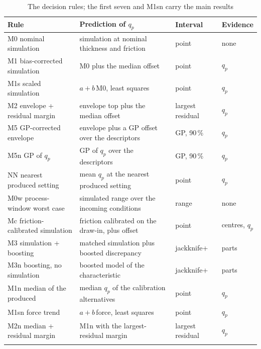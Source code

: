\documentclass[pdflatex,sn-basic,lineno]{sn-jnl}
\newcommand{\tabsize}{\fontsize{8}{9.5}\selectfont}
\begin{document}
\begin{table}[t]
\tabsize
\setlength{\tabcolsep}{3.5pt}
\caption{The decision rules; the first seven and M1sn carry the main results}\label{tab:rules}
\begin{tabular}{@{}L{3.5cm}L{4.9cm}L{1.9cm}L{1.4cm}@{}}
\toprule
Rule & Prediction of $q_p$ & Interval & Evidence \\
\midrule
M0 nominal simulation & simulation at nominal thickness and friction & point & none \\
M1 bias-corrected simulation & M0 plus the median offset & point & $q_p$ \\
M1s scaled simulation & $a+b\,$M0, least squares & point & $q_p$ \\
M2 envelope + residual margin & envelope top plus the median offset & largest residual & $q_p$ \\
M5 GP-corrected envelope & envelope plus a GP offset over the descriptors & GP, 90\,\% & $q_p$ \\
M5n GP of $q_p$ & GP of $q_p$ over the descriptors & GP, 90\,\% & $q_p$ \\
NN nearest produced setting & mean $q_p$ at the nearest produced setting & point & $q_p$ \\
\midrule
M0w process-window worst case & simulated range over the incoming conditions & range & none \\
Mc friction-calibrated simulation & friction calibrated on the draw-in, plus offset & point & centres, $q_p$ \\
M3 simulation + boosting & matched simulation plus boosted discrepancy & jackknife+ & parts \\
M3n boosting, no simulation & boosted model of the characteristic & jackknife+ & parts \\
M1n median of the produced & median $q_p$ of the calibration alternatives & point & $q_p$ \\
M1sn force trend & $a+b\,$force, least squares & point & $q_p$ \\
M2n median + residual margin & M1n with the largest-residual margin & largest residual & $q_p$ \\
\botrule
\end{tabular}
\end{table}
\end{document}
